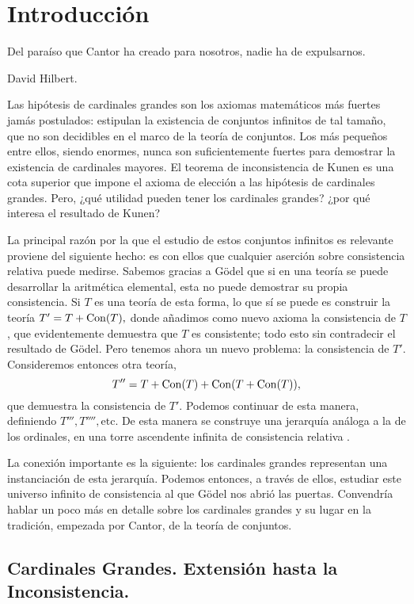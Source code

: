 \chapter*{Introducción}

\epigraph
{
Del paraíso que Cantor ha creado para nosotros, nadie ha de expulsarnos.
}
{David Hilbert. \autocite[pág 170]{hilbert_uber_1926}}

Las hipótesis de cardinales grandes son los axiomas matemáticos
más fuertes jamás postulados: estipulan la existencia de conjuntos
infinitos de tal tamaño, que no son decidibles en el marco de la teoría de conjuntos.
Los más pequeños entre ellos, siendo enormes, nunca son suficientemente
fuertes para demostrar la existencia de cardinales mayores.
El teorema de inconsistencia de Kunen es
una cota superior que impone el axioma de elección a las
hipótesis de cardinales grandes.
Pero, ¿qué utilidad pueden tener los cardinales grandes?
¿por qué interesa el resultado de Kunen?

La principal razón por la que el estudio de estos conjuntos infinitos
es relevante proviene del siguiente hecho:
es con ellos que cualquier aserción sobre consistencia relativa
puede medirse.
Sabemos gracias a Gödel que si en una teoría se puede desarrollar la aritmética
elemental, esta no puede demostrar su propia consistencia.
Si $T$ es una teoría de esta forma, lo que sí se puede es construir la teoría
$T'=T+\operatorname{Con} ( T ),$
donde añadimos como nuevo axioma la consistencia
de $T$,
que evidentemente demuestra que $T$ es consistente; todo esto sin contradecir
el resultado de Gödel. Pero tenemos ahora un nuevo problema: la consistencia
de $T'$.
Consideremos entonces otra teoría,
\[T'' = T + \operatorname{Con} ( T ) + \operatorname{Con} ( T + \operatorname{Con} ( T ) ),\]
que demuestra la consistencia de $T'$.
Podemos continuar de esta manera, definiendo $T''', T'''',\text{etc}$.
De esta manera se construye una jerarquía análoga a la de los ordinales,
en una torre ascendente infinita de consistencia relativa
\autocite[\S 7.7]{hamkins_lectures_2020}.

La conexión importante es la siguiente:
los cardinales grandes representan una instanciación de esta jerarquía.
Podemos entonces, a través de ellos, estudiar este universo infinito de
consistencia al que Gödel nos abrió las puertas.
Convendría hablar un poco más en detalle sobre los cardinales grandes
y su lugar en la tradición, empezada por Cantor, de la teoría de conjuntos.

\section*{Cardinales Grandes. Extensión hasta la Inconsistencia.}


